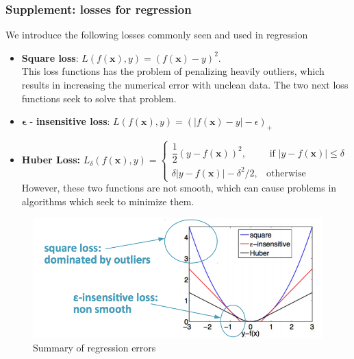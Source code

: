 \documentclass[a4paper,12pt]{article}
\newcommand{\xx}{{\bm x}}
\begin{document}
\subsubsection{Supplement: losses for regression}
We introduce the following losses commonly seen and used in regression
\begin{itemize}
\item \textbf{Square loss}: $L(f(\xx),y) = (f(\xx) - y)^{2}$. \\This loss functions has the problem of penalizing heavily outliers, which results in increasing the numerical error with unclean data. The two next loss functions seek to solve that problem.
\item $\bm{\epsilon}$ - \textbf{insensitive loss}: $L(f(\xx),y) = (|f(\xx) - y| - \epsilon)_{+}$

\item \textbf{Huber Loss:}
$
L_{\delta}(f(\xx),y) = \begin{cases}
\dfrac{1}{2}(y-f(\xx))^{2},& \text{ if } | y - f(\xx) | \leq \delta
\\
\delta |y - f(\xx)| - \delta^{2}/2,& \text{otherwise}
\end{cases}$ \\ 
However, these two functions are not smooth, which can cause problems in algorithms which seek to minimize them. 
\end{itemize}
\begin{figure}[h]
\centering
\includegraphics[scale=0.3]{errorsummary}
\caption{Summary of regression errors}
    \label{fig:creditscoring}
\end{figure}
\end{document}
